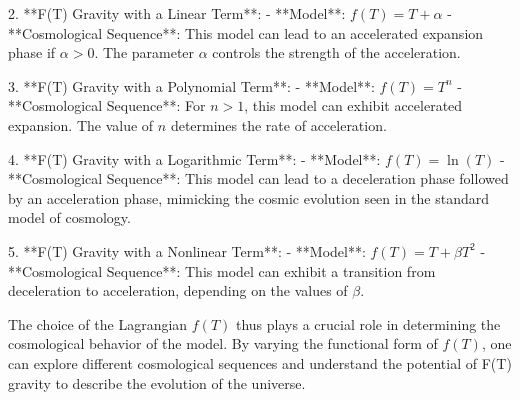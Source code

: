 2. **F(T) Gravity with a Linear Term**:
   - **Model**: \( f(T) = T + \alpha \)
   - **Cosmological Sequence**: This model can lead to an accelerated expansion phase if \( \alpha > 0 \). The parameter \( \alpha \) controls the strength of the acceleration.

3. **F(T) Gravity with a Polynomial Term**:
   - **Model**: \( f(T) = T^n \)
   - **Cosmological Sequence**: For \( n > 1 \), this model can exhibit accelerated expansion. The value of \( n \) determines the rate of acceleration.

4. **F(T) Gravity with a Logarithmic Term**:
   - **Model**: \( f(T) = \ln(T) \)
   - **Cosmological Sequence**: This model can lead to a deceleration phase followed by an acceleration phase, mimicking the cosmic evolution seen in the standard model of cosmology.

5. **F(T) Gravity with a Nonlinear Term**:
   - **Model**: \( f(T) = T + \beta T^2 \)
   - **Cosmological Sequence**: This model can exhibit a transition from deceleration to acceleration, depending on the values of \( \beta \).

The choice of the Lagrangian \( f(T) \) thus plays a crucial role in determining the cosmological behavior of the model. By varying the functional form of \( f(T) \), one can explore different cosmological sequences and understand the potential of F(T) gravity to describe the evolution of the universe.